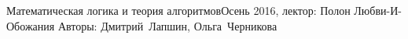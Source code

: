 


\BigHeader
	{Математическая логика и теория алгоритмов}{Осень 2016, лектор: Полон Любви-И-Обожания}
	{Авторы: Дмитрий~Лапшин, Ольга~Черникова}


